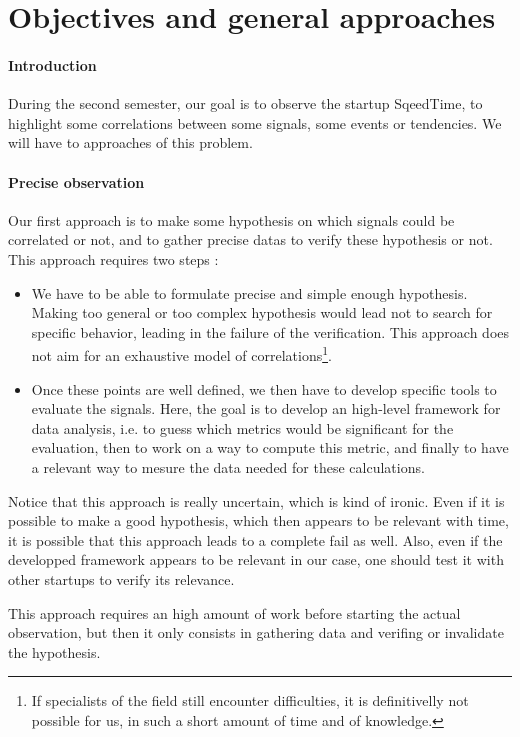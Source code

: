 \documentclass[twoside]{report}
\begin{document}
\section{Objectives and general approaches}
\paragraph{Introduction }During the second semester, our goal is to observe the startup SqeedTime, to highlight some correlations between some signals, some events or tendencies. We will have to approaches of this problem.

\paragraph{Precise observation}Our first approach is to make some hypothesis on which signals could be correlated or not, and to gather precise datas to verify these hypothesis or not. This approach requires two steps : 
\begin{itemize}
	\item We have to be able to formulate precise and simple enough hypothesis. Making too general or too complex hypothesis would lead not to search for specific behavior, leading in the failure of the verification. This approach does not aim for an exhaustive model of correlations\footnote{If specialists of the field still encounter difficulties, it is definitivelly not possible for us, in such a short amount of time and of knowledge.}.
	\item Once these points are well defined, we then have to develop specific tools to evaluate the signals. Here, the goal is to develop an high-level framework for data analysis, i.e. to guess which metrics would be significant for the evaluation, then to work on a way to compute this metric, and finally to have a relevant way to mesure the data needed for these calculations.
\end{itemize}
Notice that this approach is really uncertain, which is kind of ironic. Even if it is possible to make a good hypothesis, which then appears to be relevant with time, it is possible that this approach leads to a complete fail as well. Also, even if the developped framework appears to be relevant in our case, one should test it with other startups to verify its relevance.

This approach requires an high amount of work before starting the actual observation, but then it only consists in gathering data and verifing or invalidate the hypothesis.
\end{document}
